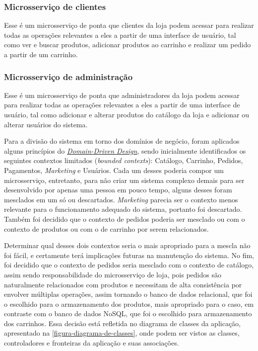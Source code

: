 \subsubsection*{Microsserviço de clientes}
Esse é um microsserviço de ponta que clientes da loja podem acessar para realizar todas as operações relevantes a eles a partir de uma interface de usuário, tal como ver e buscar produtos, adicionar produtos ao carrinho e realizar um pedido a partir de um carrinho.

\subsubsection*{Microsserviço de administração}
Esse é um microsserviço de ponta que administradores da loja podem acessar para realizar todas as operações relevantes a eles a partir de uma interface de usuário, tal como adicionar e alterar produtos do catálogo da loja e adicionar ou alterar usuários do sistema.


Para a divisão do sistema em torno dos domínios de negócio, foram aplicados alguns princípios do \hyperref[section-ddd]{\emph{Domain-Driven Design}}, sendo inicialmente identificados os seguintes contextos limitados (\emph{bounded contexts}): Catálogo, Carrinho, Pedidos, Pagamentos, \emph{Marketing} e Usuários. Cada um desses poderia compor um microsserviço, entretanto, para não criar um sistema complexo demais para ser desenvolvido por apenas uma pessoa em pouco tempo, alguns desses foram mesclados em um só ou descartados. \emph{Marketing} parecia ser o contexto menos relevante para o funcionamento adequado do sistema, portanto foi descartado. Também foi decidido que o contexto de pedidos poderia ser mesclado ou com o contexto de produtos ou com o de carrinho por serem relacionados.


Determinar qual desses dois contextos seria o mais apropriado para a mescla não foi fácil, e certamente terá implicações futuras na manutenção do sistema. No fim, foi decidido que o contexto de pedidos seria mesclado com o contexto de catálogo, assim sendo responsabilidade do microsserviço de loja, pois pedidos são naturalmente relacionados com produtos e necessitam de alta consistência por envolver múltiplas operações, assim tornando o banco de dados relacional, que foi o escolhido para o armazenamento dos produtos, mais apropriado para o caso, em contraste com o banco de dados NoSQL, que foi o escolhido para armazenamento dos carrinhos. Essa decisão está refletida no diagrama de classes da aplicação, apresentado na \autoref{figura-diagrama-de-classes}, onde podem ser vistos as classes, controladores e fronteiras da aplicação e suas associações.

